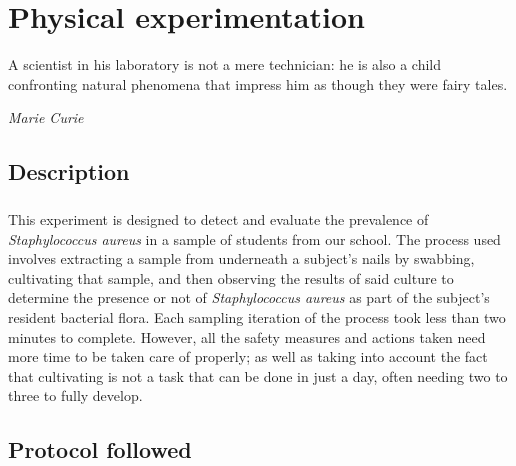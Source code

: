 \chapter{Physical experimentation}
\epigraph{A scientist in his laboratory is not a mere technician: he is also a child confronting natural phenomena that impress him as though they were fairy tales.}{\textit{Marie Curie}}
\section{Description}
\paragraph{}This experiment is designed to detect and evaluate the prevalence of \emph{Staphylococcus aureus} in a sample of students from our school. The process used involves extracting a sample from underneath a subject's nails by swabbing, cultivating that sample, and then observing the results of said culture to determine the presence or not of \emph{Staphylococcus aureus} as part of the subject's resident bacterial flora. Each sampling iteration of the process took less than two minutes to complete. However, all the safety measures and actions taken need more time to be taken care of properly; as well as taking into account the fact that cultivating is not a task that can be done in just a day, often needing two to three to fully develop.
\section{Protocol followed}
